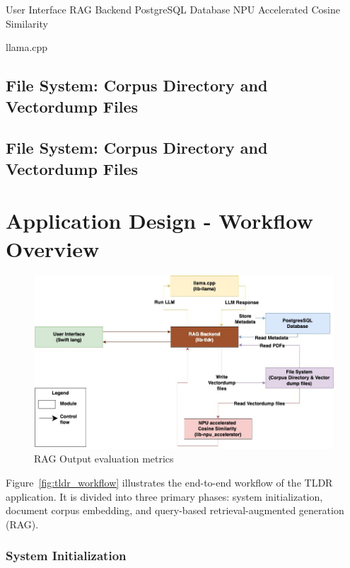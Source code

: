 User Interface RAG Backend  PostgreSQL Database NPU Accelerated Cosine Similarity  {llama.cpp
\subsection{File System: Corpus Directory and Vectordump Files}
\label{subsec:FSandVectordump_files}


\subsection{File System: Corpus Directory and Vectordump Files}
\label{subsec:FSandVectordump_files}



\section{Application Design - Workflow Overview}
\label{subsec:TldrWorkflowOverview}

\begin{figure}[H]
    \centering
    \includegraphics[width=1.0\linewidth]{images/tldr-app-module-interactions.jpg}
    \caption{RAG Output evaluation metrics ~\cite{cardenas2023rag}}
    \label{fig:autoregressive_decoding}
\end{figure}


Figure~\ref{fig:tldr_workflow} illustrates the end-to-end workflow of the TLDR application. It is divided into three primary phases: system initialization, document corpus embedding, and query-based retrieval-augmented generation (RAG).

\subsubsection{System Initialization}

}
